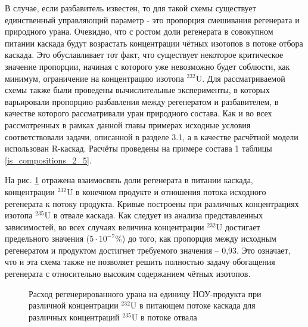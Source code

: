 В случае, если разбавитель известен, то для такой схемы существует единственный управляющий параметр - это пропорция смешивания регенерата и природного урана. Очевидно, что с ростом доли регенерата в совокупном питании каскада будут возрастать концентрации чётных изотопов в потоке отбора каскада. Это обуславливает тот факт, что существует некоторое критическое значение пропорции, начиная с которого уже невозможно будет соблюсти, как минимум, ограничение на концентрацию изотопа $^{232}$U. Для рассматриваемой схемы также были проведены вычислительные эксперименты, в которых варьировали пропорцию разбавления между регенератом и разбавителем, в качестве которого рассматривали уран природного состава. Как и во всех рассмотренных в рамках данной главы примерах исходные условия соответствовали задачи, описанной в разделе 3.1, а в качестве расчётной модели использован R-каскад. Расчёты проведены на примере состава 1 таблицы \ref{is_compositions_2_5}. 

На рис. \ref{sc3_1.second} отражена взаимосвязь доли регенерата в питании каскада, концентрации $^{232}$U в конечном продукте и отношения потока исходного регенерата к потоку продукта. Кривые построены при различных концентрациях изотопа $^{235}$U в отвале каскада. Как следует из анализа представленных зависимостей, во всех случаях величина концентрации  $^{232}$U достигает предельного значения ($5\cdot10^{-7}$\%) до того, как пропорция между исходным регенератом и продуктом достигнет требуемого значения -- 0,93. Это означает, что и эта схема также не позволяет решить полностью задачу обогащения регенерата с относительно высоким содержанием чётных изотопов. 

\begin{figure}[ht]
  \caption{Расход регенерированного урана на единицу НОУ-продукта  при различной концентрации $^{232}$U в питающем потоке каскада для различных концентраций $^{235}$U в потоке отвала}\label{sc3_1.second}
\end{figure}


